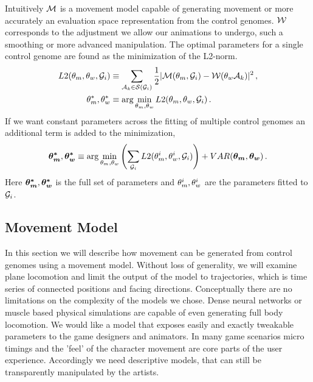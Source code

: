 Intuitively $\mathcal{M}$ is a movement model capable of generating movement or more accurately an evaluation space representation from the control genomes. $\mathcal{W}$ corresponds to the adjustment we allow our animations to undergo, such a smoothing or more advanced manipulation. The optimal parameters for a single control genome are found as the minimization of the L2-norm.
\begin{subequations}
\begin{align}
    {L2}(\theta_{m},\theta_{w},\mathcal{G}_i)
    &\equiv
    \sum_{\mathcal{A}_k\in\mathcal{S}(\mathcal{G}_i)}
    {
        \frac{1}{2}
        |\mathcal{M}(\theta_{m},\mathcal{G}_i)
        -
        \mathcal{W}(\theta_{w}\mathcal{A}_k)|^2
    }\,,
    \label{eq:optim:single}
    \\
    \theta_{m}^*,\theta_{w}^*
    &\equiv \arg\min_{\theta_{m},\theta_{w}}
    {
        {L2}(\theta_{m},\theta_{w},\mathcal{G}_i)
    }\,.
\end{align}
\end{subequations}
If we want constant parameters across the fitting of multiple control genomes an additional term is added to the minimization, 
\begin{equation}
    \boldsymbol{\theta_{m}^* },\boldsymbol{\theta_{w}^* }
    \equiv 
    \arg\min_{\theta_{m},\theta_{w}}
    \left(
        \sum_{\mathcal{G}_i}
        {L2}(\theta_{m}^i,\theta_{w}^i,\mathcal{G}_i)
    \right)
    +
    VAR(\boldsymbol{\theta_{m} },\boldsymbol{\theta_{w} })\,.
\end{equation}
Here $\boldsymbol{\theta_{m}^* },\boldsymbol{\theta_{w}^* }$ is the full set of parameters and $\theta_{m}^i,\theta_{w}^i$ are the parameters fitted to $\mathcal{G}_i$.

\subsection{Movement Model}
In this section we will describe how movement can be generated from control genomes using a movement model. Without loss of generality, we will examine plane locomotion and limit the output of the model to trajectories, which is time series of connected positions and facing directions. 
Conceptually there are no limitations on the complexity of the models we chose. Dense neural networks \magnus{[ref]} or muscle based physical simulations \magnus{[ref]} are capable of even generating full body locomotion. We would like a model that exposes easily and exactly tweakable parameters to the game designers and animators. In many game scenarios micro timings and the 'feel' of the character movement are core parts of the user experience. Accordingly we need descriptive models, that can still be transparently manipulated by the artists. 

